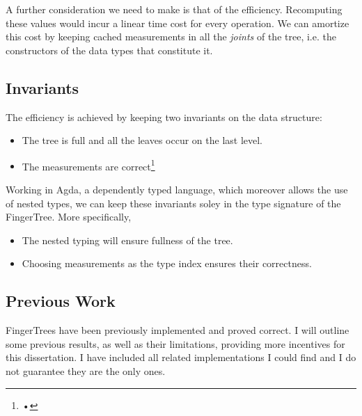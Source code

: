 \documentclass[12pt,twoside,notitlepage]{report}
\begin{document}
A further consideration we need to make is that of the efficiency. Recomputing these values would incur a linear time cost for every operation. We can amortize this cost by keeping cached measurements in all the \textit{joints} of the tree, i.e. the constructors of the data types that constitute it.

\subsection{Invariants}

The efficiency is achieved by keeping two invariants on the data structure:
\begin{itemize}
	\item The tree is full and all the leaves occur on the last level. 
	\item The measurements are correct\footnote{•}
\end{itemize}

Working in Agda, a dependently typed language, which moreover allows the use of nested types, we can keep these invariants soley in the type signature of the FingerTree. More specifically,
\begin{itemize}
	\item The nested typing will ensure fullness of the tree.
	\item Choosing measurements as the type index ensures their correctness.  
\end{itemize} 

\subsection{Previous Work}

FingerTrees have been previously implemented and proved correct. I will outline some previous results, as well as their limitations, providing more incentives for this dissertation. I have included all related implementations I could find and I do not guarantee they are the only ones.
\end{document}
